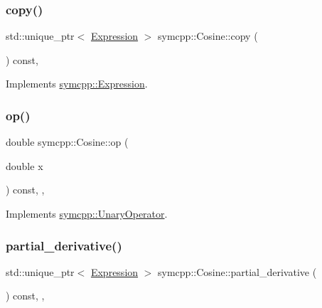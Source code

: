 \subsubsection{\texorpdfstring{copy()}{copy()}}
{\footnotesize\ttfamily std\+::unique\+\_\+ptr$<$ \mbox{\hyperlink{classsymcpp_1_1Expression}{Expression}} $>$ symcpp\+::\+Cosine\+::copy (\begin{DoxyParamCaption}{ }\end{DoxyParamCaption}) const\hspace{0.3cm}{\ttfamily [override]}, {\ttfamily [virtual]}}



Implements \mbox{\hyperlink{classsymcpp_1_1Expression_a2e7de5a295ccf0efdc9b34cea7ba3d0b}{symcpp\+::\+Expression}}.

\mbox{\label{classsymcpp_1_1Cosine_a0b476eebbffe0a2914a02bf6d14b05cd}} 
\subsubsection{\texorpdfstring{op()}{op()}}
{\footnotesize\ttfamily double symcpp\+::\+Cosine\+::op (\begin{DoxyParamCaption}\item[{double}]{x }\end{DoxyParamCaption}) const\hspace{0.3cm}{\ttfamily [override]}, {\ttfamily [private]}, {\ttfamily [virtual]}}



Implements \mbox{\hyperlink{classsymcpp_1_1UnaryOperator_a679c3c46cad3a62bdd776ff836c7891e}{symcpp\+::\+Unary\+Operator}}.

\mbox{\label{classsymcpp_1_1Cosine_a92a24c87300b0e400f286b6ecc4eb1dd}} 
\subsubsection{\texorpdfstring{partial\_derivative()}{partial\_derivative()}}
{\footnotesize\ttfamily std\+::unique\+\_\+ptr$<$ \mbox{\hyperlink{classsymcpp_1_1Expression}{Expression}} $>$ symcpp\+::\+Cosine\+::partial\+\_\+derivative (\begin{DoxyParamCaption}{ }\end{DoxyParamCaption}) const\hspace{0.3cm}{\ttfamily [override]}, {\ttfamily [private]}, {\ttfamily [virtual]}}



